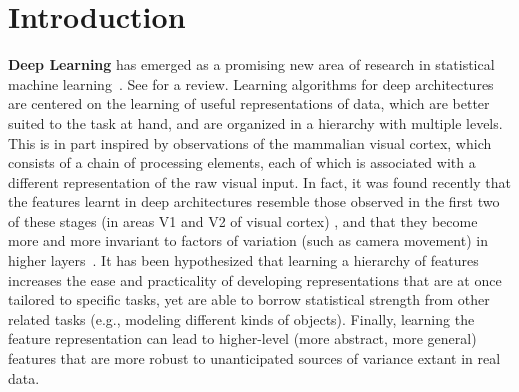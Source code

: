 \documentclass{article} %
\begin{document}



\section{Introduction}

{\bf Deep Learning} has emerged as a promising new area of research in
statistical machine learning~\citep{Hinton06,ranzato-07-small,Bengio-nips-2006,VincentPLarochelleH2008-very-small,ranzato-08,TaylorHintonICML2009,Larochelle-jmlr-2009,Salakhutdinov+Hinton-2009,HonglakL2009,HonglakLNIPS2009,Jarrett-ICCV2009,Taylor-cvpr-2010}. See \citet{Bengio-2009} for a review.
Learning algorithms for deep architectures are centered on the learning
of useful representations of data, which are better suited to the task at hand,
and are organized in a hierarchy with multiple levels.
This is in part inspired by observations of the mammalian visual cortex, 
which consists of a chain of processing elements, each of which is associated with a
different representation of the raw visual input. In fact,
it was found recently that the features learnt in deep architectures resemble
those observed in the first two of these stages (in areas V1 and V2
of visual cortex) \citep{HonglakL2008}, and that they become more and
more invariant to factors of variation (such as camera movement) in
higher layers~\citep{Goodfellow2009}.
It has been hypothesized that learning a hierarchy of features increases the
ease and practicality of developing representations that are at once
tailored to specific tasks, yet are able to borrow statistical strength
from other related tasks (e.g., modeling different kinds of objects). Finally, learning the
feature representation can lead to higher-level (more abstract, more
general) features that are more robust to unanticipated sources of
variance extant in real data.
\end{document}

